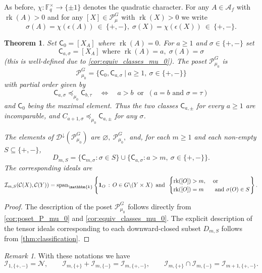 \documentclass[11pt,a4paper]{amsart}
\theoremstyle{plain}%
\newtheorem{theorem}[lemma]{Theorem}
\theoremstyle{definition}
\theoremstyle{remark}
\newtheorem{remark}[lemma]{Remark}
\newcommand{\Span}{\mathrm{span}}
\newcommand{\rk}{{\operatorname{rk}}}
\newcommand{\F}{{\mathbb F}}
\newcommand{\kk}{\mathbbm{k}}
\newcommand{\one}{{\mathbf{1}}}
\newcommand{\Down}{\mathcal{D}^{\downarrow}}
\newcommand{\N}{\mathcal N}
\begin{document}
  As before, $\chi: \F_q^{\times} \to \{\pm 1\}$ denotes the quadratic character. For any $A\in \mathcal{A}_f$ with $\rk(A)>0$ and for any $[X]\in \mathcal{P}^G_{\mu}$ with $\rk(X)>0$ we write
\[
 \sigma(A)=\chi(\epsilon(A))~\in~\{+,-\}, \;  \sigma(X)=\chi(\epsilon(X))~\in~\{+,-\}.
\]


\begin{theorem}\label{thm:orthogonal-zero}
    Set $\mathsf C_0=[X_A]$ where $ \rk(A)=0.$ For $a\geq1$ and $\sigma\in\{+,-\}$ set $$\mathsf C_{a,\sigma} =[X_A] \text{ where } \rk(A)=a, \; \sigma(A)=\sigma
$$ (this is well-defined due to \cref{cor:equiv_classes_mu_0}). The poset $\mathcal{P}_{\mu_0}^G$ is $$\mathcal{P}_{\mu_0}^G=\{\mathsf C_0, \mathsf C_{a,\sigma}~|~a\geq 1, ~\sigma\in\{+,-\}\}$$
with partial order given by
\[
 \mathsf C_{a,\sigma}\preceq_{\mu_0} \mathsf C_{b,\tau}
 \quad\Longleftrightarrow\quad
 a>b\ \text{ or }\ (a=b\text{ and }\sigma=\tau) 
\] and $\mathsf C_0$ being the maximal element.  Thus the two classes $\mathsf C_{a,\pm}$ for every $a\geq 1$ are incomparable, and $C_{a+1, \sigma}\preceq_{\mu_0} \mathsf C_{a, \pm}$ for any $\sigma$.

The elements of $\Down(\mathcal{P}_{{\mu_0}}^G)$ are
$
 \varnothing,~ \mathcal{P}_{\mu_0}^G,
$
and, for each $m\geq1$ and each non-empty $ S\subseteq\{+,-\}$,
\[
 D_{m,S}
 =\{\mathsf C_{m,\sigma}:\sigma\in S\}
  \cup\{\mathsf C_{a,\sigma}:a>m,\ \sigma\in\{+,-\}\}.
\]
The corresponding ideals are
\[
 \mathcal I_{m,S}(\mathcal{C}(X),\mathcal{C}(Y))
 =\Span_\kk\left\{\one_O\,:\, O\in  G\backslash (Y\times X) \, \text{ and } \,
 \begin{cases}
      \rk([O])>m,\ &\text{or}\\
 \rk([O])=m&\text{ and }\sigma(O)\in S
 \end{cases}
\right\}.
\]

\end{theorem}
\begin{proof}

The description of the poset $\mathcal{P}_{{\mu_0}}^G$ follows directly from \cref{cor:poset_P_mu_0} and \cref{cor:equiv_classes_mu_0}. The explicit description of the tensor ideals corresponding to each downward-closed subset $D_{m, S}$ follows from \cref{thm:classification}.



\end{proof}
\begin{remark}
  With these notations we have 
\[
 \mathcal I_{1,\{+,-\}}=\N,
 \qquad
 \mathcal I_{m,\{+\}}+\mathcal I_{m,\{-\}}=\mathcal I_{m,\{+,-\}},
 \qquad
 \mathcal I_{m,\{+\}}\cap\mathcal I_{m,\{-\}}=\mathcal I_{m+1,\{+,-\}}.
\]
\end{remark}
\end{document}
